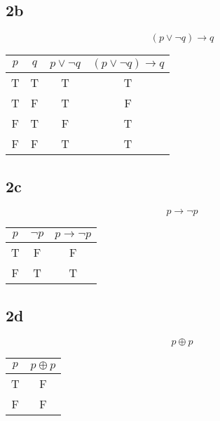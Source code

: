 \documentclass{math}
\begin{document}
\subsection*{2b}
\[ (p \vee \neg{q}) \to q \]
\begin{center}
  \begin{tabular}{|c|c|c|c|}
    \hline
    \( p \) & \( q \) & \( p \vee \neg{q} \) & \( (p \vee \neg{q}) \to q \) \\
      \hline
    T       & T       & T                    & T \\ \hline
    T       & F       & T                    & F \\ \hline
    F       & T       & F                    & T \\ \hline
    F       & F       & T                    & T \\ \hline
  \end{tabular}
\end{center}

\subsection*{2c}
\[ p \to \neg{p} \]
\begin{center}
  \begin{tabular}{|c|c|c|}
    \hline
    \( p \) & \( \neg{p} \) & \( p \to \neg{p} \) \\ \hline
    T       & F             & F                   \\ \hline
    F       & T             & T                   \\ \hline
  \end{tabular}
\end{center}

\subsection*{2d}
\[ p \oplus p \]
\begin{center}
  \begin{tabular}{|c|c|}
    \hline
    \( p \) & \( p \oplus p \) \\ \hline
    T       & F                \\ \hline
    F       & F                \\ \hline
  \end{tabular}
\end{center}
\end{document}
